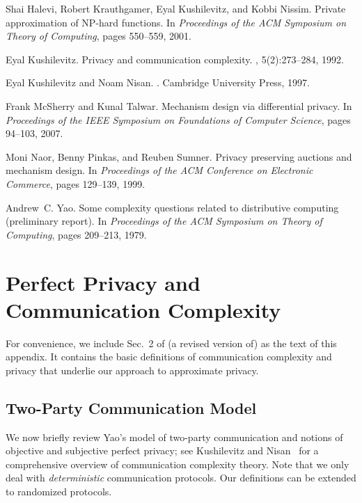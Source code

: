 \documentclass{article}
\theoremstyle{theorem}
\theoremstyle{definition}
\theoremstyle{remark}
\begin{document}
\begin{thebibliography}{10}
Shai Halevi, Robert Krauthgamer, Eyal Kushilevitz, and Kobbi Nissim.
\newblock Private approximation of {NP}-hard functions.
\newblock In {\em Proceedings of the ACM Symposium on Theory of Computing},
  pages 550--559, 2001.

Eyal Kushilevitz.
\newblock Privacy and communication complexity.
, 5(2):273--284, 1992.

Eyal Kushilevitz and Noam Nisan.
.
\newblock Cambridge University Press, 1997.

Frank McSherry and Kunal Talwar.
\newblock Mechanism design via differential privacy.
\newblock In {\em Proceedings of the IEEE Symposium on Foundations of Computer
  Science}, pages 94--103, 2007.

Moni Naor, Benny Pinkas, and Reuben Sumner.
\newblock Privacy preserving auctions and mechanism design.
\newblock In {\em Proceedings of the ACM Conference on Electronic Commerce},
  pages 129--139, 1999.

Andrew~C. Yao.
\newblock Some complexity questions related to distributive computing
  (preliminary report).
\newblock In {\em Proceedings of the ACM Symposium on Theory of Computing},
  pages 209--213, 1979.

\end{thebibliography}

\appendix

\section{Perfect Privacy and Communication Complexity}\label{ap:model}

For convenience, we include Sec.~2 of (a revised version of) \cite{fjs09tr14} as the text of this appendix.
It contains the basic definitions of communication complexity and privacy that underlie our approach to
approximate privacy.

\subsection{Two-Party Communication Model}\label{subsec-Yao}

We now briefly review Yao's model of two-party communication and
notions of objective and subjective perfect privacy; see Kushilevitz
and Nisan~\cite{KN97} for a comprehensive overview of communication
complexity theory.  Note that we only deal with \emph{deterministic}
communication protocols. Our definitions can be extended to
randomized protocols.
\end{document}
